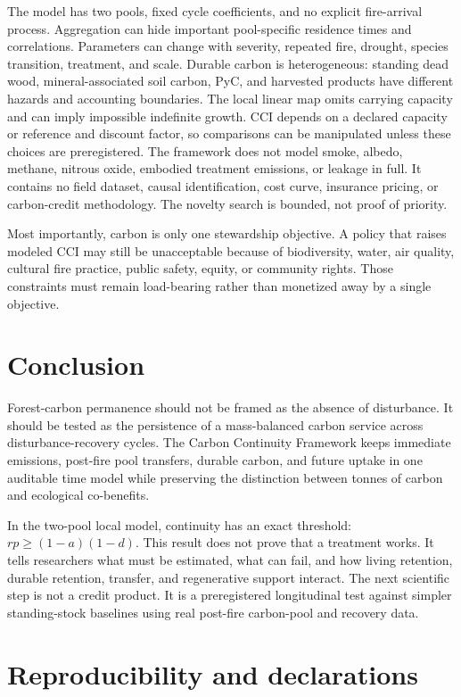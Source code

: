 \documentclass[10pt]{article}
\begin{document}
The model has two pools, fixed cycle coefficients, and no explicit fire-arrival
process.  Aggregation can hide important pool-specific residence times and
correlations.  Parameters can change with severity, repeated fire, drought,
species transition, treatment, and scale.  Durable carbon is heterogeneous:
standing dead wood, mineral-associated soil carbon, PyC, and harvested products
have different hazards and accounting boundaries.  The local linear map omits
carrying capacity and can imply impossible indefinite growth.  CCI depends on a
declared capacity or reference and discount factor, so comparisons can be
manipulated unless these choices are preregistered.  The framework does not
model smoke, albedo, methane, nitrous oxide, embodied treatment emissions, or
leakage in full.  It contains no field dataset, causal identification, cost
curve, insurance pricing, or carbon-credit methodology.  The novelty search is
bounded, not proof of priority.

Most importantly, carbon is only one stewardship objective.  A policy that
raises modeled CCI may still be unacceptable because of biodiversity, water,
air quality, cultural fire practice, public safety, equity, or community rights.
Those constraints must remain load-bearing rather than monetized away by a
single objective.

\section{Conclusion}

Forest-carbon permanence should not be framed as the absence of disturbance.
It should be tested as the persistence of a mass-balanced carbon service across
disturbance-recovery cycles.  The Carbon Continuity Framework keeps immediate
emissions, post-fire pool transfers, durable carbon, and future uptake in one
auditable time model while preserving the distinction between tonnes of carbon
and ecological co-benefits.

In the two-pool local model, continuity has an exact threshold:
$rp\ge(1-a)(1-d)$.  This result does not prove that a treatment works.  It tells
researchers what must be estimated, what can fail, and how living retention,
durable retention, transfer, and regenerative support interact.  The next
scientific step is not a credit product.  It is a preregistered longitudinal
test against simpler standing-stock baselines using real post-fire carbon-pool
and recovery data.

\section*{Reproducibility and declarations}
\end{document}
